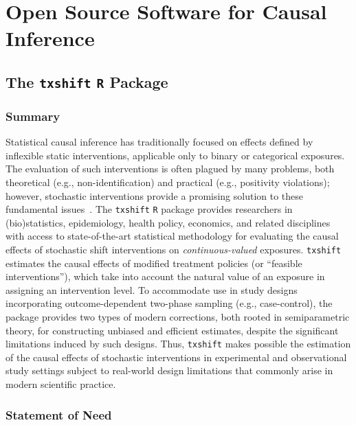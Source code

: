 \chapter{Open Source Software for Causal Inference}

\section{The \texttt{txshift} \texttt{R} Package}

\subsection{Summary}

Statistical causal inference has traditionally focused on effects defined by
inflexible static interventions, applicable only to binary or categorical
exposures. The evaluation of such interventions is often plagued by many
problems, both theoretical (e.g., non-identification) and practical (e.g.,
positivity violations); however, stochastic interventions provide a promising
solution to these fundamental issues~\citep{diaz2018stochastic}. The
\texttt{txshift} \texttt{R} package provides researchers in (bio)statistics,
epidemiology, health policy, economics, and related disciplines with access to
state-of-the-art statistical methodology for evaluating the causal effects of
stochastic shift interventions on \textit{continuous-valued} exposures.
\texttt{txshift} estimates the causal effects of modified treatment policies (or
``feasible interventions''), which take into account the natural value of an
exposure in assigning an intervention level. To accommodate use in study designs
incorporating outcome-dependent two-phase sampling (e.g., case-control), the
package provides two types of modern corrections, both rooted in semiparametric
theory, for constructing unbiased and efficient estimates, despite the
significant limitations induced by such designs. Thus, \texttt{txshift} makes
possible the estimation of the causal effects of stochastic interventions in
experimental and observational study settings subject to real-world design
limitations that commonly arise in modern scientific practice.

\subsection{Statement of Need}

